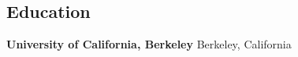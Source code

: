 \documentclass[margin,centered]{resVoyles}
\begin{document}
\begin{resume}

% 






\section{\sc Education}
{\bf University of California, Berkeley}  \hfill{ Berkeley, California}


\end{resume}
\end{document}
